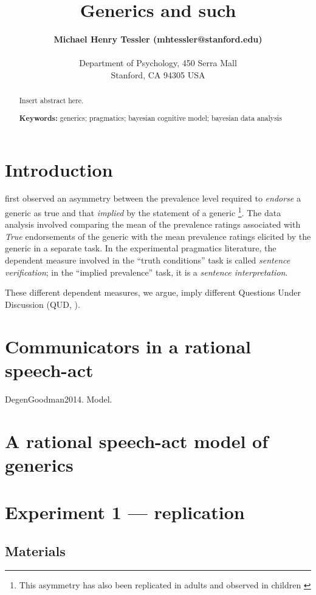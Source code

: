 \documentclass[10pt,letterpaper]{article}
\title{Generics and such}
\author{{\large \bf Michael Henry Tessler (mhtessler@stanford.edu)} \\
  \AND {\large \bf Noah D. Goodman (ngoodman@stanford.edu)} \\
  Department of Psychology, 450 Serra Mall \\
  Stanford, CA 94305 USA}
\begin{document}
\maketitle


\begin{abstract}
Insert abstract here.

\textbf{Keywords:} 
generics; pragmatics; bayesian cognitive model; bayesian data analysis
\end{abstract}

\section{Introduction}

 first observed an asymmetry between the prevalence level required to \emph{endorse} a generic as true and that \emph{implied} by the statement of a generic \footnote{This asymmetry has also been replicated in adults and observed in children \cite{Brandone2014}}. The data analysis involved comparing the mean of the prevalence ratings associated with \emph{True} endorsements of the generic with the mean prevalence ratings elicited by the generic in a separate task. In the experimental pragmatics literature, the dependent measure involved in the ``truth conditions'' task is called \emph{sentence verification}; in the ``implied prevalence'' task, it is a \emph{sentence interpretation}. 

These different dependent measures, we argue, imply different Questions Under Discussion (QUD, \cite{Roberts2004}). 



\section{Communicators in a rational speech-act}

DegenGoodman2014. Model.

\section{A rational speech-act model of generics}

\section{Experiment 1 ---  replication}

\subsection{Materials}
\end{document}

